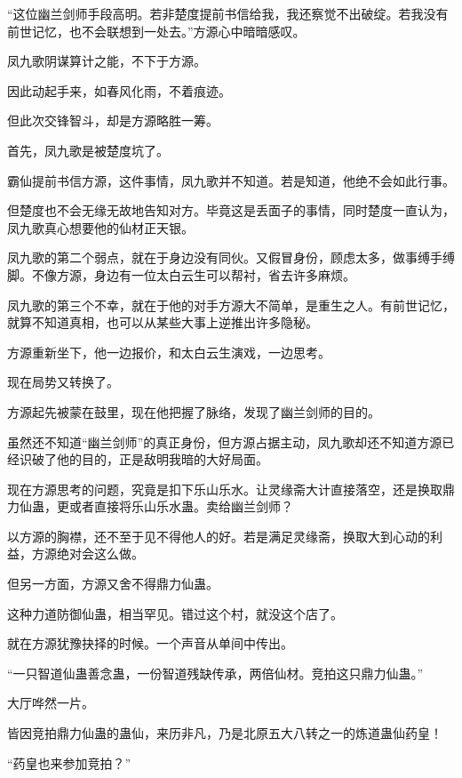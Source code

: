 
\begin{this_body}

“这位幽兰剑师手段高明。若非楚度提前书信给我，我还察觉不出破绽。若我没有前世记忆，也不会联想到一处去。”方源心中暗暗感叹。

凤九歌阴谋算计之能，不下于方源。

因此动起手来，如春风化雨，不着痕迹。

但此次交锋智斗，却是方源略胜一筹。

首先，凤九歌是被楚度坑了。

霸仙提前书信方源，这件事情，凤九歌并不知道。若是知道，他绝不会如此行事。

但楚度也不会无缘无故地告知对方。毕竟这是丢面子的事情，同时楚度一直认为，凤九歌真心想要他的仙材正天银。

凤九歌的第二个弱点，就在于身边没有同伙。又假冒身份，顾虑太多，做事缚手缚脚。不像方源，身边有一位太白云生可以帮衬，省去许多麻烦。

凤九歌的第三个不幸，就在于他的对手方源大不简单，是重生之人。有前世记忆，就算不知道真相，也可以从某些大事上逆推出许多隐秘。

方源重新坐下，他一边报价，和太白云生演戏，一边思考。

现在局势又转换了。

方源起先被蒙在鼓里，现在他把握了脉络，发现了幽兰剑师的目的。

虽然还不知道“幽兰剑师”的真正身份，但方源占据主动，凤九歌却还不知道方源已经识破了他的目的，正是敌明我暗的大好局面。

现在方源思考的问题，究竟是扣下乐山乐水。让灵缘斋大计直接落空，还是换取鼎力仙蛊，更或者直接将乐山乐水蛊。卖给幽兰剑师？

以方源的胸襟，还不至于见不得他人的好。若是满足灵缘斋，换取大到心动的利益，方源绝对会这么做。

但另一方面，方源又舍不得鼎力仙蛊。

这种力道防御仙蛊，相当罕见。错过这个村，就没这个店了。

就在方源犹豫抉择的时候。一个声音从单间中传出。

“一只智道仙蛊善念蛊，一份智道残缺传承，两倍仙材。竞拍这只鼎力仙蛊。”

大厅哗然一片。

皆因竞拍鼎力仙蛊的蛊仙，来历非凡，乃是北原五大八转之一的炼道蛊仙药皇！

“药皇也来参加竞拍？”


\end{this_body}
